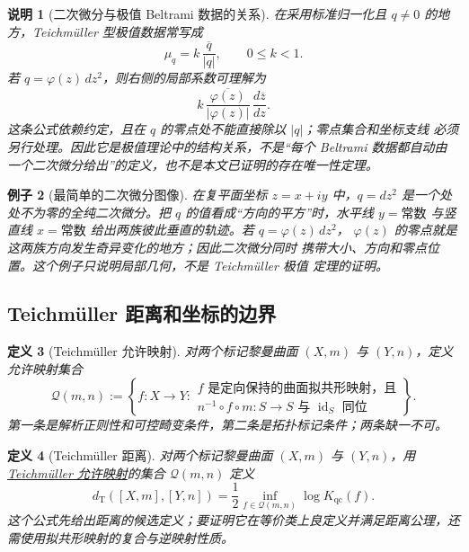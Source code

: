 \documentclass[UTF8,fontset=none,a4paper,11pt]{ctexart}
\theoremstyle{foundation-definition}
\newtheorem{definition}{定义}[section]
\theoremstyle{foundation-theorem}
\theoremstyle{foundation-proposition}
\theoremstyle{foundation-example}
\newtheorem{example}[definition]{例子}
\theoremstyle{foundation-remark}
\newtheorem{remark}[definition]{说明}
\theoremstyle{foundation-theorem}
\newcommand{\term}[2]{\hyperref[#1]{#2}}
\begin{document}
\begin{remark}[二次微分与极值 Beltrami 数据的关系]
在采用标准归一化且 \(q\neq0\) 的地方，Teichmüller 型极值数据常写成
\[
\mu_q=k\,\frac{\overline q}{|q|},\qquad 0\leq k<1.
\]
若 \(q=\varphi(z)\,dz^2\)，则右侧的局部系数可理解为
\[
k\,\frac{\overline{\varphi(z)}}{|\varphi(z)|}\,
\frac{d\overline z}{dz}.
\]
这条公式依赖约定，且在 \(q\) 的零点处不能直接除以 \(|q|\)；零点集合和坐标支线
必须另行处理。因此它是极值理论中的结构关系，不是“每个 Beltrami 数据都自动由
一个二次微分给出”的定义，也不是本文已证明的存在唯一性定理。
\end{remark}

\begin{example}[最简单的二次微分图像]
在复平面坐标 \(z=x+iy\) 中，\(q=dz^2\) 是一个处处不为零的全纯二次微分。把
\(q\) 的值看成“方向的平方”时，水平线 \(y=\text{常数}\) 与竖直线
\(x=\text{常数}\) 给出两族彼此垂直的轨迹。若 \(q=\varphi(z)\,dz^2\)，
\(\varphi(z)\) 的零点就是这两族方向发生奇异变化的地方；因此二次微分同时
携带大小、方向和零点位置。这个例子只说明局部几何，不是 Teichmüller 极值
定理的证明。
\end{example}

\subsection{Teichmüller 距离和坐标的边界}

\begin{definition}[Teichmüller 允许映射]\label{def:teich-admissible-map}
对两个标记黎曼曲面 \((X,m)\) 与 \((Y,n)\)，定义允许映射集合
\[
\mathcal Q(m,n):=
\left\{
f:X\to Y:
\begin{array}{l}
f\text{ 是定向保持的曲面拟共形映射，且}\\
n^{-1}\circ f\circ m:S\to S\text{ 与 }\operatorname{id}_S\text{ 同位}
\end{array}
\right\}.
\]
第一条是解析正则性和可控畸变条件，第二条是拓扑标记条件；两条缺一不可。
\end{definition}

\begin{definition}[Teichmüller 距离]\label{def:teich-distance}
对两个标记黎曼曲面 \((X,m)\) 与 \((Y,n)\)，用
\term{def:teich-admissible-map}{Teichmüller 允许映射}的集合 \(\mathcal Q(m,n)\) 定义
\[
d_{\mathrm T}([X,m],[Y,n])
=\frac12\inf_{f\in\mathcal Q(m,n)}\log K_{\mathrm{qc}}(f).
\]
这个公式先给出距离的候选定义；要证明它在等价类上良定义并满足距离公理，还需使用拟共形映射的复合与逆映射性质。
\end{definition}
\end{document}

